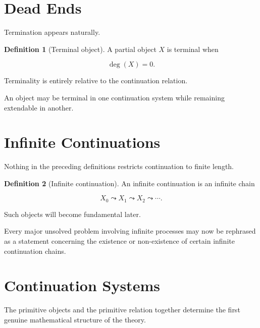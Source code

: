 \documentclass[13pt,openany]{book}
\theoremstyle{plain}
\theoremstyle{definition}
\newtheorem{definition}{Definition}[chapter]
\begin{document}
\section{Dead Ends}

Termination appears naturally.

\begin{definition}[Terminal object]
A partial object \(X\) is terminal when

\[
\deg(X)=0.
\]
\end{definition}

Terminality is entirely relative to the continuation relation.

An object may be terminal in one continuation system while remaining
extendable in another.

\section{Infinite Continuations}

Nothing in the preceding definitions restricts continuation to finite
length.

\begin{definition}[Infinite continuation]
An infinite continuation is an infinite chain

\[
X_0
\leadsto
X_1
\leadsto
X_2
\leadsto
\cdots.
\]
\end{definition}

Such objects will become fundamental later.

Every major unsolved problem involving infinite processes may now be
rephrased as a statement concerning the existence or non-existence of
certain infinite continuation chains.

\section{Continuation Systems}

The primitive objects and the primitive relation together determine the
first genuine mathematical structure of the theory.
\end{document}
